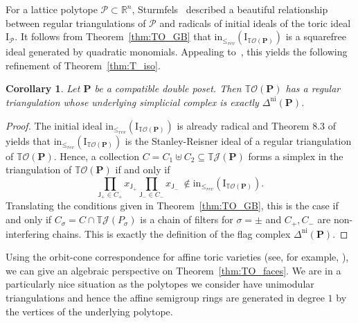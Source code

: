 \documentclass[11pt]{amsart}
\newtheorem{cor}[thm]{Corollary}
\theoremstyle{definition}
\begin{document}
For a lattice polytope ${\mathcal{P}} \subset {\mathbb{R}}^n$,
Sturmfels~\cite[Thm.~8.3]{Sturmfels96} described a beautiful relationship
between regular triangulations of ${\mathcal{P}}$ and radicals of initial ideals of the
toric ideal ${\mathrm{I}}_{\mathcal{P}}$. It follows from Theorem~\ref{thm:TO_GB} that
${\textrm{in}_{\le_{rev}}}({\mathrm{I}}_{{{\mathbb{T}}{\mathcal{O}({\mathbf{P}})}}})$ is a squarefree ideal generated by quadratic monomials.
Appealing to~\cite[Thm.~8.3]{Sturmfels96}, this yields the following
refinement of Theorem~\ref{thm:T_iso}.

\begin{cor}\label{cor:TO_triang}
    Let ${\mathbf{P}}$ be a compatible double poset. Then ${{\mathbb{T}}{\mathcal{O}({\mathbf{P}})}}$ has a
    regular triangulation whose underlying simplicial complex is exactly
    ${\Delta^\mathrm{ni}({\mathbf{P}})}$.
\end{cor}
\begin{proof}
    The initial ideal ${\textrm{in}_{\le_{rev}}}({\mathrm{I}}_{{{\mathbb{T}}{\mathcal{O}({\mathbf{P}})}}})$ is already radical and Theorem 8.3
    of~\cite{Sturmfels96} yields that ${\textrm{in}_{\le_{rev}}}({\mathrm{I}}_{{{\mathbb{T}}{\mathcal{O}({\mathbf{P}})}}})$ is the
    Stanley-Reisner ideal of a regular triangulation of ${{\mathbb{T}}{\mathcal{O}({\mathbf{P}})}}$.
    Hence, a collection $C = C_1 \uplus C_2 \subseteq {{\mathbb{T}}{{\mathcal{J}}({{\mathbf{P}}})}}$ forms a
    simplex in the triangulation of ${{\mathbb{T}}{\mathcal{O}({\mathbf{P}})}}$ if and only if 
    \[
        \prod_{{\mathsf{J}}_+ \in C_+} x_{{\mathsf{J}}_+}
        \prod_{{\mathsf{J}}_- \in C_-} x_{{\mathsf{J}}_-} \ \not\in {\textrm{in}_{\le_{rev}}}({\mathrm{I}}_{{{\mathbb{T}}{\mathcal{O}({\mathbf{P}})}}}).
    \]
    Translating the conditions given in Theorem~\ref{thm:TO_GB}, this is the case
    if and only if $C_\sigma = C \cap {{\mathbb{T}}{{\mathcal{J}}({{{P}_\sigma}})}}$ is a chain of filters
    for $\sigma = \pm$ and $C_+, C_-$ are non-interfering chains. This is
    exactly the definition of the flag complex ${\Delta^\mathrm{ni}({\mathbf{P}})}$.
\end{proof}

Using the orbit-cone correspondence for affine toric varieties (see, for
example, \cite[Sect.~3.2]{CLS}), we can give an algebraic perspective on
Theorem~\ref{thm:TO_faces}. We are in a particularly nice situation as the
polytopes we consider have unimodular triangulations and hence the affine
semigroup rings are generated in degree $1$ by the vertices of the underlying
polytope.
\end{document}
